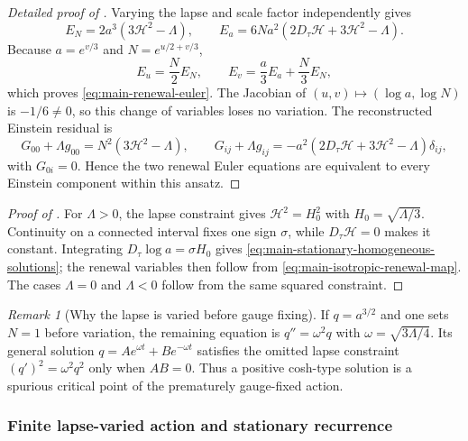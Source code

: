\documentclass[11pt]{article}
\numberwithin{equation}{section}
\theoremstyle{definition}
\theoremstyle{remark}
\newtheorem{remark}[remark]{Remark}
\begin{document}
\begin{proof}[Detailed proof of ]
Varying the lapse and scale factor independently gives
\begin{equation}
 E_N=2a^3(3\mathcal H^2-\Lambda),\qquad
 E_a=6Na^2(2D_\tau\mathcal H+3\mathcal H^2-\Lambda).
 \label{eq:supp-homogeneous-EaEN}
\end{equation}
Because
$a=e^{v/3}$ and $N=e^{u/2+v/3}$,
\[
 E_u=\frac N2E_N,\qquad
 E_v=\frac a3E_a+\frac N3E_N,
\]
which proves \eqref{eq:main-renewal-euler}.  The Jacobian of
$(u,v)\mapsto(\log a,\log N)$ is $-1/6\ne0$, so this change of
variables loses no variation.  The reconstructed Einstein residual is
\begin{equation}
 G_{00}+\Lambda g_{00}=N^2(3\mathcal H^2-\Lambda),
 \qquad
 G_{ij}+\Lambda g_{ij}
 =-a^2(2D_\tau\mathcal H+3\mathcal H^2-\Lambda)\delta_{ij},
 \label{eq:supp-homogeneous-Einstein-residual}
\end{equation}
with $G_{0i}=0$.  Hence the two renewal Euler equations are equivalent to every
Einstein component within this ansatz.
\end{proof}

\begin{proof}[Proof of ]
For $\Lambda>0$, the lapse constraint gives
$\mathcal H^2=H_0^2$ with $H_0=\sqrt{\Lambda/3}$.  Continuity on a
connected interval fixes one sign $\sigma$, while
$D_\tau\mathcal H=0$ makes it constant.  Integrating
$D_\tau\log a=\sigma H_0$ gives
\eqref{eq:main-stationary-homogeneous-solutions}; the renewal variables then
follow from \eqref{eq:main-isotropic-renewal-map}.  The cases $\Lambda=0$ and
$\Lambda<0$ follow from the same squared constraint.
\end{proof}

\begin{remark}[Why the lapse is varied before gauge fixing]
If $q=a^{3/2}$ and one sets $N=1$ before variation, the remaining equation is
$q''=\omega^2q$ with $\omega=\sqrt{3\Lambda/4}$.  Its general solution
$q=Ae^{\omega t}+Be^{-\omega t}$ satisfies the omitted lapse constraint
$(q')^2=\omega^2q^2$ only when $AB=0$.  Thus a positive cosh-type solution is a
spurious critical point of the prematurely gauge-fixed action.
\end{remark}

\subsubsection{Finite lapse-varied action and stationary recurrence}
\end{document}

